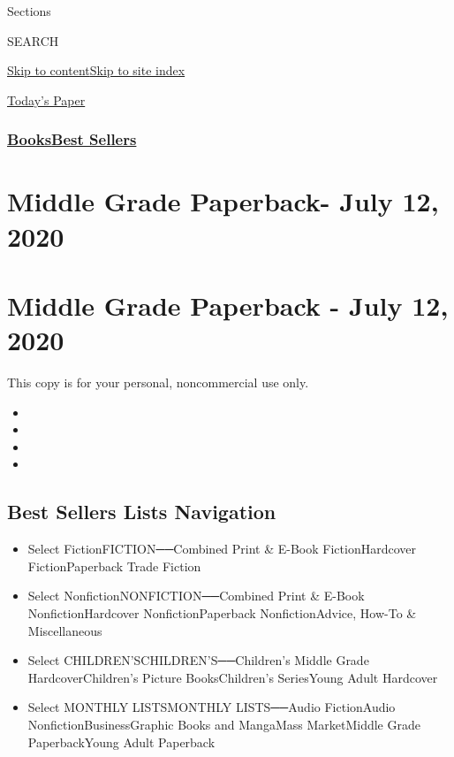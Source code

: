 Sections

SEARCH

\protect\hyperlink{site-content}{Skip to
content}\protect\hyperlink{site-index}{Skip to site index}

\href{https://myaccount.nytimes3xbfgragh.onion/auth/login?response_type=cookie\&client_id=vi}{}

\href{https://www.nytimes3xbfgragh.onion/section/todayspaper}{Today's
Paper}

\hypertarget{booksbest-sellers}{%
\subsubsection{\texorpdfstring{\href{/section/books/}{Books}\textbar{}\href{/books/best-sellers/}{Best
Sellers}}{Books\textbar{}Best Sellers}}\label{booksbest-sellers}}

\hypertarget{middle-grade-paperback--july-12-2020}{%
\section{Middle Grade Paperback- July 12,
2020}\label{middle-grade-paperback--july-12-2020}}

\hypertarget{middle-grade-paperback---july-12-2020}{%
\section{Middle Grade Paperback - July 12,
2020}\label{middle-grade-paperback---july-12-2020}}

This copy is for your personal, noncommercial use only.

\begin{itemize}
\item
\item
\item
\item
\end{itemize}

\hypertarget{best-sellers-lists-navigation}{%
\subsection{Best Sellers Lists
Navigation}\label{best-sellers-lists-navigation}}

\begin{itemize}
\tightlist
\item
  Select FictionFICTION──Combined Print \& E-Book FictionHardcover
  FictionPaperback Trade Fiction
\item
  Select NonfictionNONFICTION──Combined Print \& E-Book
  NonfictionHardcover NonfictionPaperback NonfictionAdvice, How-To \&
  Miscellaneous
\item
  Select CHILDREN'SCHILDREN'S──Children's Middle Grade
  HardcoverChildren's Picture BooksChildren's SeriesYoung Adult
  Hardcover
\item
  Select MONTHLY LISTSMONTHLY LISTS──Audio FictionAudio
  NonfictionBusinessGraphic Books and MangaMass MarketMiddle Grade
  PaperbackYoung Adult Paperback
\end{itemize}

